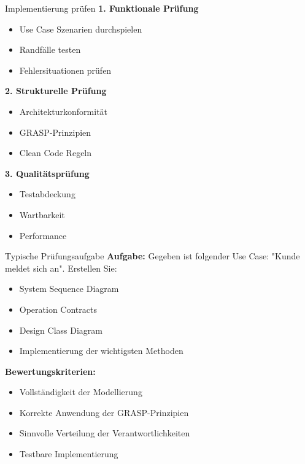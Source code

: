 \begin{KR}{Implementierung prüfen}
\textbf{1. Funktionale Prüfung}
\begin{itemize}
    \item Use Case Szenarien durchspielen
    \item Randfälle testen
    \item Fehlersituationen prüfen
\end{itemize}

\textbf{2. Strukturelle Prüfung}
\begin{itemize}
    \item Architekturkonformität
    \item GRASP-Prinzipien
    \item Clean Code Regeln
\end{itemize}

\textbf{3. Qualitätsprüfung}
\begin{itemize}
    \item Testabdeckung
    \item Wartbarkeit
    \item Performance
\end{itemize}
\end{KR}

\begin{example2}{Typische Prüfungsaufgabe}
\textbf{Aufgabe:} 
Gegeben ist folgender Use Case: "Kunde meldet sich an". Erstellen Sie:
\begin{itemize}
    \item System Sequence Diagram
    \item Operation Contracts
    \item Design Class Diagram
    \item Implementierung der wichtigsten Methoden
\end{itemize}

\textbf{Bewertungskriterien:}
\begin{itemize}
    \item Vollständigkeit der Modellierung
    \item Korrekte Anwendung der GRASP-Prinzipien
    \item Sinnvolle Verteilung der Verantwortlichkeiten
    \item Testbare Implementierung
\end{itemize}
\end{example2}

